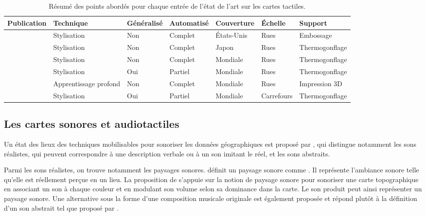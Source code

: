 \begin{table}[ht]
\begin{center}
\scriptsize
\begin{tabular}{ | l | l | l | l | l | l | l | }
    Publication & Technique & Généralisé & Automatisé & Couverture & Échelle & Support \tabularnewline
    \hline
    \citep{Miele2004} & Stylisation & Non & Complet & États-Unis & Rues & Embossage \tabularnewline
    \citep{Minatani2010} & Stylisation & Non & Complet & Japon & Rues & Thermogonflage \tabularnewline
    \citep{Watanabe2014, Cervenka2016} & Stylisation & Non & Complet & Mondiale & Rues & Thermogonflage \tabularnewline
    \citep{Stampach2016} & Stylisation & Oui & Partiel & Mondiale & Rues & Thermogonflage \tabularnewline
    \citep{FillieresRiveau2020} & Apprentissage profond & Non & Complet & Mondiale & Rues & Impression 3D \tabularnewline
    \citep{Jiang2023} & Stylisation & Oui & Partiel & Mondiale & Carrefours & Thermogonflage \tabularnewline
\end{tabular}
\end{center}
\caption[Résumé de l'état de l'art sur la génération de cartes en relief]{Résumé des points abordés pour chaque entrée de l'état de l'art sur les cartes tactiles.}
\label{tab:ea_relief}
\end{table}


\label{ea_cartetactile}

\subsection{Les cartes sonores et audiotactiles}

\label{ea_cartessonores}

Un état des lieux des techniques mobilisables pour sonoriser les données géographiques est proposé par \citet{Krygier1994}, qui distingue notamment les sons réalistes, qui peuvent correspondre à une description verbale ou à un son imitant le réel, et les sons abstraits.

\newpar{}


Parmi les sons réalistes, on trouve notamment les paysages sonores. \citet{Porteous1985} définit un paysage sonore comme . Il représente l'ambiance sonore telle qu'elle est réellement perçue en un lieu. La proposition de \citet{Josselin2016} s'appuie sur la notion de paysage sonore pour sonoriser une carte topographique en associant un son à chaque couleur et en modulant son volume selon sa dominance dans la carte. Le son produit peut ainsi représenter un paysage sonore. Une alternative sous la forme d'une composition musicale originale est également proposée et répond plutôt à la définition d'un son abstrait tel que proposé par \citet{Krygier1994}.

